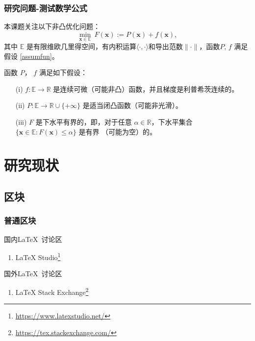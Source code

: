\documentclass[AutoFakeBold,AutoFakeSlant]{beamer}
\begin{document}
\begin{frame}
\frametitle{研究问题-测试数学公式}
本课题关注以下非凸优化问题：
\begin{equation}\label{mainpro}
\min\limits_{\bm{x} \in\mathbb{E}}~F(\bm{x} ) := P(\bm{x}) + f(\bm{x}),
\end{equation}
其中 $\mathbb{E}$ 是有限维欧几里得空间，有内积运算$\langle\cdot,\cdot\rangle$和导出范数$\|\cdot\|$，函数$P$, $f$ 满足假设 \ref{assumfun}。
\begin{assumption}\label{assumfun}
函数 $P$， $f$ 满足如下假设：
\begin{itemize}
\item[{\rm (i)}] $f: \mathbb{E} \rightarrow \mathbb{R}$ 是连续可微（可能非凸）函数，并且梯度是利普希茨连续的。
\item[{\rm (ii)}] $P: \mathbb{E} \rightarrow \mathbb{R} \cup \{+\infty\}$ 是适当闭凸函数（可能非光滑）。 
\item[{\rm (iii)}] $F$ 是下水平有界的，即，对于任意 $\alpha \in \mathbb{R}$，下水平集合 $\big\{\bm{x} \in \mathbb{E} : F(\bm{x}) \leq \alpha\big\}$ 是有界 （可能为空）的。
\end{itemize}
\end{assumption}
\end{frame}

\section{研究现状}

\subsection{区块}

\begin{frame}
  \frametitle{普通区块}

  \begin{block}{国内\LaTeX\ 讨论区}
    \begin{enumerate}
      \item LaTeX Studio\footnote{\url{https://www.latexstudio.net/}}
    \end{enumerate}
  \end{block}

  \begin{block}{国外\LaTeX\ 讨论区}
    \begin{enumerate}
      \item LaTeX Stack Exchange\footnote{\url{https://tex.stackexchange.com/}}
    \end{enumerate}
  \end{block}
\end{frame}
\end{document}
